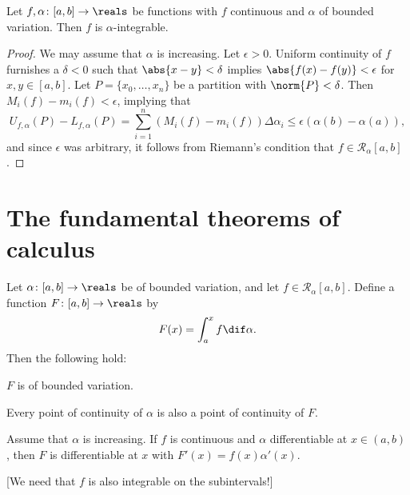 \documentclass[article, a4paper, 11pt, oneside]{memoir}
\numberwithin{equation}{chapter}
\newcommand{\calR}{\mathcal{R}}
\begin{document}
\begin{proposition}
    Let $f,\alpha \colon [a,b] \to \reals$ be functions with $f$ continuous and $\alpha$ of bounded variation. Then $f$ is $\alpha$-integrable.
\end{proposition}

\begin{proof}
    We may assume that $\alpha$ is increasing. Let $\epsilon > 0$. Uniform continuity of $f$ furnishes a $\delta < 0$ such that $\abs{x-y} < \delta$ implies $\abs{f(x)-f(y)} < \epsilon$ for $x,y \in [a,b]$. Let $P = \{x_0,\ldots,x_n\}$ be a partition with $\norm{P} < \delta$. Then $M_i(f) - m_i(f) < \epsilon$, implying that
    \begin{equation*}
        U_{f,\alpha}(P) - L_{f,\alpha}(P)
            = \sum_{i=1}^n (M_i(f) - m_i(f)) \Delta\alpha_i
            \leq \epsilon (\alpha(b) - \alpha(a)),
    \end{equation*}
    and since $\epsilon$ was arbitrary, it follows from Riemann's condition that $f \in \calR_\alpha[a,b]$.
\end{proof}


\section{The fundamental theorems of calculus}

\begin{theorem}
    Let $\alpha \colon [a,b] \to \reals$ be of bounded variation, and let $f \in \calR_\alpha[a,b]$. Define a function $F \colon [a,b] \to \reals$ by
    \begin{equation*}
        F(x)
            = \int_a^x f \dif\alpha.
    \end{equation*}
    Then the following hold:
    \begin{enumthm}
        \item $F$ is of bounded variation.
        \item Every point of continuity of $\alpha$ is also a point of continuity of $F$.
        \item Assume that $\alpha$ is increasing. If $f$ is continuous and $\alpha$ differentiable at $x \in (a,b)$, then $F$ is differentiable at $x$ with $F'(x) = f(x) \alpha'(x)$.
    \end{enumthm}
\end{theorem}
%
[We need that $f$ is also integrable on the subintervals!]
\end{document}
